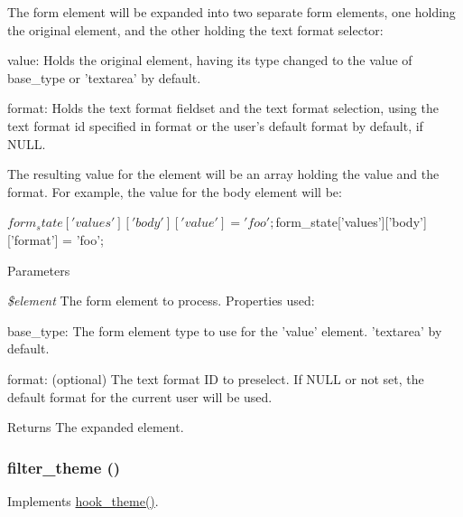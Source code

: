 The form element will be expanded into two separate form elements, one holding the original element, and the other holding the text format selector:
\begin{DoxyItemize}
\item value: Holds the original element, having its type changed to the value of base\_\-type or 'textarea' by default.
\item format: Holds the text format fieldset and the text format selection, using the text format id specified in format or the user's default format by default, if NULL.
\end{DoxyItemize}

The resulting value for the element will be an array holding the value and the format. For example, the value for the body element will be: 
\begin{DoxyCode}
   $form_state['values']['body']['value'] = 'foo';
   $form_state['values']['body']['format'] = 'foo';
\end{DoxyCode}



\begin{DoxyParams}{Parameters}
\item[{\em \$element}]The form element to process. Properties used:
\begin{DoxyItemize}
\item base\_\-type: The form element type to use for the 'value' element. 'textarea' by default.
\item format: (optional) The text format ID to preselect. If NULL or not set, the default format for the current user will be used.
\end{DoxyItemize}\end{DoxyParams}
\begin{DoxyReturn}{Returns}
The expanded element. 
\end{DoxyReturn}
\hypertarget{filter_8module_a1ceba1ca80bae00ae5eaf6eeb2758409}{
\subsubsection[{filter\_\-theme}]{\setlength{\rightskip}{0pt plus 5cm}filter\_\-theme ()}}
\label{filter_8module_a1ceba1ca80bae00ae5eaf6eeb2758409}
Implements \hyperlink{group__hooks_ga013ccb45c7aaab1c16cf9691428c910d}{hook\_\-theme()}. 